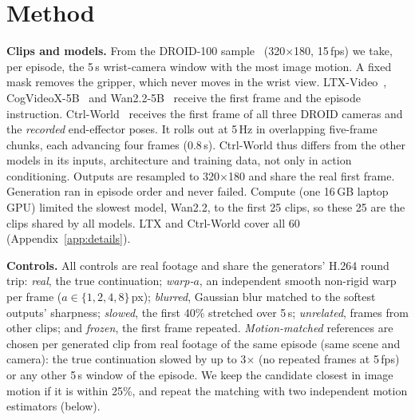 \documentclass{article}
\begin{document}
\section{Method}
\textbf{Clips and models.} From the DROID-100 sample~\citep{khazatsky2024droid} (320$\times$180, 15\,fps)
we take, per episode, the 5\,s wrist-camera window with the most image motion. A fixed mask removes
the gripper, which never moves in the wrist view. LTX-Video~\citep{hacohen2024ltxvideo},
CogVideoX-5B~\citep{yang2025cogvideox} and Wan2.2-5B~\citep{wan2025wan} receive the first frame and the
episode instruction. Ctrl-World~\citep{guo2026ctrlworld} receives the first frame of all three DROID
cameras and the \emph{recorded} end-effector poses. It rolls out at 5\,Hz in overlapping five-frame
chunks, each advancing four frames (0.8\,s). Ctrl-World thus differs from the other models in its
inputs, architecture and training data, not only in action conditioning. Outputs are resampled to
320$\times$180 and share the real first frame. Generation ran in episode order and never failed. Compute
(one 16\,GB laptop GPU) limited the slowest model, Wan2.2, to the first 25 clips, so these 25 are the
clips shared by all models. LTX and Ctrl-World cover all 60 (Appendix~\ref{app:details}).

\textbf{Controls.} All controls are real footage and share the generators' H.264 round trip:
\emph{real}, the true continuation; \emph{warp-$a$}, an independent smooth non-rigid warp per frame
($a\in\{1,2,4,8\}$\,px); \emph{blurred}, Gaussian blur matched to the softest outputs' sharpness;
\emph{slowed}, the first 40\% stretched over 5\,s; \emph{unrelated}, frames from other clips; and
\emph{frozen}, the first frame repeated. \emph{Motion-matched} references are chosen per generated
clip from real footage of the same episode (same scene and camera): the true continuation slowed by
up to 3$\times$ (no repeated frames at 5\,fps) or any other 5\,s window of the episode. We keep the
candidate closest in image motion if it is within 25\%, and repeat the matching with two independent
motion estimators (below).
\end{document}
